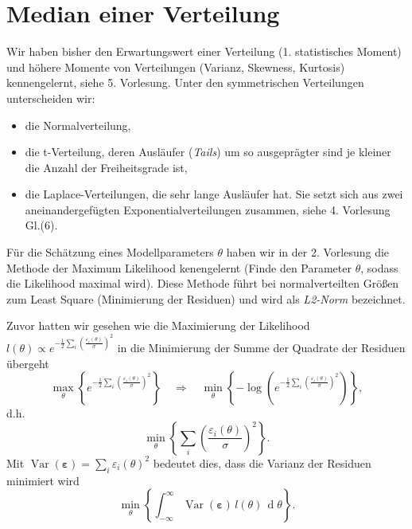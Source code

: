 \section{Median einer Verteilung}
Wir haben bisher den Erwartungswert einer Verteilung (1. statistisches Moment) und höhere Momente von Verteilungen (Varianz, Skewness, Kurtosis) kennengelernt, siehe 5. Vorlesung. Unter den symmetrischen Verteilungen unterscheiden wir: 
\begin{itemize}
	\item die Normalverteilung,
	\item die t-Verteilung, deren Ausläufer (\textit{Tails}) um so ausgeprägter sind je kleiner die Anzahl der Freiheitsgrade ist, 
	\item die Laplace-Verteilungen, die sehr lange Ausläufer hat. Sie 
	setzt sich aus zwei aneinandergefügten Exponentialverteilungen zusammen, siehe
	4. Vorlesung Gl.(6).  
\end{itemize}

Für die Schätzung eines Modellparameters $\theta$ haben wir in 
der 2. Vorlesung die Methode der Maximum Likelihood kenengelernt 
(\glqq Finde den Parameter $\theta$, sodass die Likelihood maximal wird\grqq). Diese Methode führt bei normalverteilten Größen zum Least Square (Minimierung der Residuen) und wird als \textit{L2-Norm} bezeichnet. 

Zuvor hatten wir gesehen wie die Maximierung der Likelihood
$l(\theta) \propto e^{-\frac{1}{2}\sum_i \left(\frac{\varepsilon_i(\theta)}{\sigma}\right)^2}$
in die Minimierung der Summe der Quadrate der Residuen übergeht
$$
\max_{\theta} \left\{ e^{-\frac{1}{2}\sum_i \left(\frac{\varepsilon_i(\theta)}{\sigma}\right)^2} \right\}
\quad \Rightarrow \quad
\min_{\theta} \left\{ -\log\left(e^{-\frac{1}{2}\sum_i \left(\frac{\varepsilon_i(\theta)}{\sigma}\right)^2} \right) \right\} ,
$$
d.h.
$$
\min_{\theta} \left\{ \sum_i \left(\frac{\varepsilon_i(\theta)}{\sigma}\right)^2 \right\} .
$$
Mit $\operatorname{Var}(\boldsymbol \varepsilon) = \sum_i \varepsilon_i(\theta)^2$ bedeutet dies, dass
die Varianz der Residuen minimiert wird
\begin{equation}
\min_{\theta} \left\{ \int_{-\infty}^{\infty} \operatorname{Var}(\boldsymbol \varepsilon)  \, l(\theta) \, \operatorname d \theta \right\} .
\end{equation}

